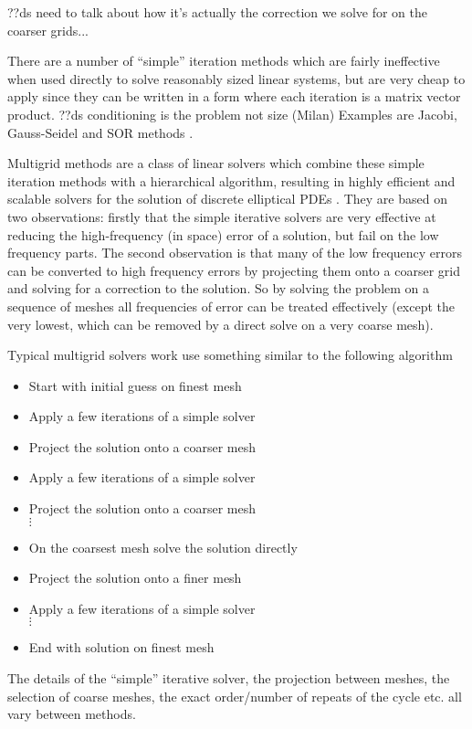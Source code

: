 ??ds need to talk about how it's actually the correction we solve for on the coarser grids...

There are a number of ``simple'' iteration methods which are fairly ineffective when used directly to solve reasonably sized linear systems, but are very cheap to apply since they can be written in a form where each iteration is a matrix vector product.
??ds conditioning is the problem not size (Milan)
Examples are Jacobi, Gauss-Seidel and SOR methods \cite[103]{Saad2000}.

Multigrid methods are a class of linear solvers which combine these simple iteration methods with a hierarchical algorithm, resulting in highly efficient and scalable solvers for the solution of discrete elliptical PDEs \cite{multigrid-tut}.
They are based on two observations: firstly that the simple iterative solvers are very effective at reducing the high-frequency (in space) error of a solution, but fail on the low frequency parts.
The second observation is that many of the low frequency errors can be converted to high frequency errors by projecting them onto a coarser grid and solving for a correction to the solution.
So by solving the problem on a sequence of meshes all frequencies of error can be treated effectively (except the very lowest, which can be removed by a direct solve on a very coarse mesh).

Typical multigrid solvers work use something similar to the following algorithm
\begin{itemize}
\item Start with initial guess on finest mesh
\item Apply a few iterations of a simple solver
\item Project the solution onto a coarser mesh
\item Apply a few iterations of a simple solver
\item Project the solution onto a coarser mesh \\
  $\vdots$
\item On the coarsest mesh solve the solution directly
\item Project the solution onto a finer mesh
\item Apply a few iterations of a simple solver \\
  $\vdots$
\item End with solution on finest mesh
\end{itemize}
The details of the ``simple'' iterative solver, the projection between meshes, the selection of coarse meshes, the exact order/number of repeats of the cycle etc. all vary between methods.

